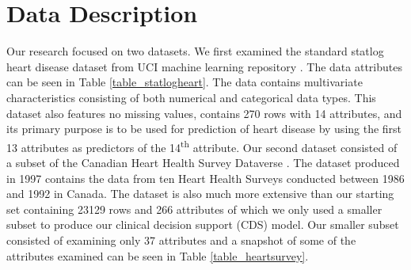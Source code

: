 \documentclass[conference]{IEEEtran}
\begin{document}
\section{Data Description}
Our research focused on two datasets. We first examined the standard statlog heart disease dataset from UCI machine learning repository \cite{StatlogHeart}.  The data attributes can be seen in Table \ref{table_statlogheart}.  The data contains multivariate characteristics consisting of both numerical and categorical data types.
This dataset also features no missing values, contains 270 rows with 14 attributes, and its primary purpose is to be used for prediction of heart disease by using the first 13 attributes as predictors of the 14\textsuperscript{th} attribute.
Our second dataset consisted of a subset of the Canadian Heart Health Survey Dataverse \cite{HealthSurvey}. The dataset produced in 1997 contains the data from ten Heart Health Surveys conducted between 1986 and 1992 in Canada. The dataset is also much more extensive than our starting set containing 23129 rows and 266 attributes of which we only used a smaller subset to produce our clinical decision support (CDS) model.
Our smaller subset consisted of examining only 37 attributes and a snapshot of some of the attributes examined can be seen in Table \ref{table_heartsurvey}.
\end{document}
